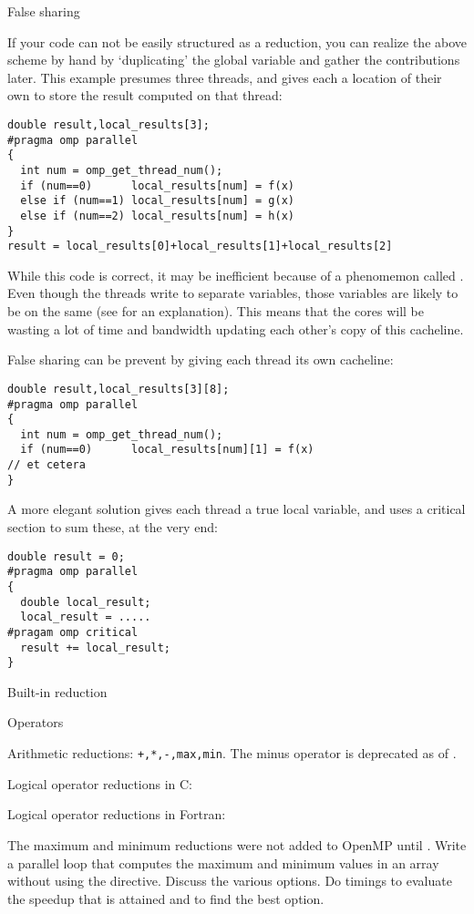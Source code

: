  {False sharing}

If your code can not be easily structured as a reduction, you can 
realize the above scheme by hand by
`duplicating' the global variable and gather the contributions later.
This example presumes three threads, and gives each a location of their
own to store the result computed on that thread:
\begin{lstlisting}
double result,local_results[3];
#pragma omp parallel
{
  int num = omp_get_thread_num();
  if (num==0)      local_results[num] = f(x)
  else if (num==1) local_results[num] = g(x)
  else if (num==2) local_results[num] = h(x)
}
result = local_results[0]+local_results[1]+local_results[2]
\end{lstlisting}
While this code is correct, it may be inefficient because of a
phenomemon called . Even though the threads write
to separate variables, those variables are likely to be on the same 
 (see  for an explanation).
This means that the cores will be wasting a lot of time and bandwidth updating
each other's copy of this cacheline.

False sharing can be prevent by giving each thread its own cacheline:
\begin{lstlisting}
double result,local_results[3][8];
#pragma omp parallel
{
  int num = omp_get_thread_num();
  if (num==0)      local_results[num][1] = f(x)
// et cetera
}
\end{lstlisting}
A more elegant solution gives each thread a true local variable,
and uses a critical section to sum these, at the very end:
\begin{lstlisting}
double result = 0;
#pragma omp parallel
{
  double local_result;
  local_result = .....
#pragam omp critical
  result += local_result;
}
\end{lstlisting}

 {Built-in reduction}

 {Operators}

Arithmetic reductions: \lstinline{+,*,-,max,min}.
The minus operator is deprecated as of .

Logical operator reductions in C: \n{& && | || ^}

Logical operator reductions in Fortran:

\begin{exercise}
  The maximum and minimum reductions were not added to OpenMP until
  .
  Write a parallel loop that computes the maximum and
  minimum values in an array without using the  directive.
  Discuss the various options. Do timings
  to evaluate the speedup that is attained and to find the best option.
\end{exercise}


